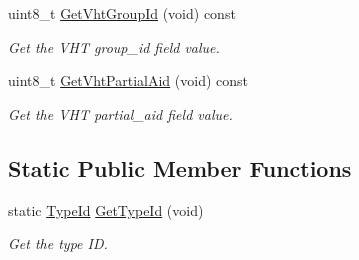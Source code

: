 \begin{DoxyCompactItemize}
uint8\+\_\+t \hyperlink{classns3_1_1RadiotapHeader_a291c66eac185f240cfa2333d1a05b13b}{Get\+Vht\+Group\+Id} (void) const 
\begin{DoxyCompactList}\small\item\em Get the V\+HT group\+\_\+id field value. \end{DoxyCompactList}\item 
uint8\+\_\+t \hyperlink{classns3_1_1RadiotapHeader_aae984f806fbbaa841c51a7a82b7b27eb}{Get\+Vht\+Partial\+Aid} (void) const 
\begin{DoxyCompactList}\small\item\em Get the V\+HT partial\+\_\+aid field value. \end{DoxyCompactList}\end{DoxyCompactItemize}
\subsection*{Static Public Member Functions}
\begin{DoxyCompactItemize}
\item 
static \hyperlink{classns3_1_1TypeId}{Type\+Id} \hyperlink{classns3_1_1RadiotapHeader_a506fd04b7d5eade12170d11da23394ac}{Get\+Type\+Id} (void)
\begin{DoxyCompactList}\small\item\em Get the type ID. \end{DoxyCompactList}\end{DoxyCompactItemize}

